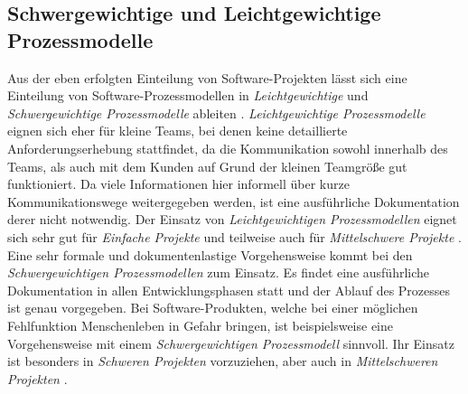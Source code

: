 \subsection{Schwergewichtige und Leichtgewichtige Prozessmodelle}

Aus der eben erfolgten Einteilung von Software-Projekten lässt sich eine Einteilung von Software-Prozessmodellen in \textit{Leichtgewichtige} und \textit{Schwergewichtige Prozessmodelle} ableiten \cite{Hanser2010}. \newline
\textit{Leichtgewichtige Prozessmodelle} eignen sich eher für kleine Teams, bei denen keine detaillierte Anforderungserhebung stattfindet, da die Kommunikation sowohl innerhalb des Teams, als auch mit dem Kunden auf Grund der kleinen Teamgröße gut funktioniert. Da viele Informationen hier informell über kurze Kommunikationswege weitergegeben werden, ist eine ausführliche Dokumentation derer nicht notwendig. Der Einsatz von \textit{Leichtgewichtigen Prozessmodellen} eignet sich sehr gut für \textit{Einfache Projekte} und teilweise auch für \textit{Mittelschwere Projekte} \cite{Hanser2010}. \newline
Eine sehr formale und dokumentenlastige Vorgehensweise kommt bei den \textit{Schwergewichtigen Prozessmodellen} zum Einsatz. Es findet eine ausführliche Dokumentation in allen Entwicklungsphasen statt und der Ablauf des Prozesses ist genau vorgegeben. Bei Software-Produkten, welche bei einer möglichen Fehlfunktion Menschenleben in Gefahr bringen, ist beispielsweise eine Vorgehensweise mit einem \textit{Schwergewichtigen Prozessmodell} sinnvoll. Ihr Einsatz ist besonders in \textit{Schweren Projekten} vorzuziehen, aber auch in \textit{Mittelschweren Projekten} \cite{Hanser2010}. \newline













